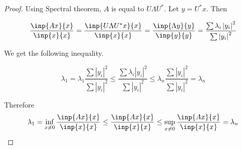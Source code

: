 \documentclass[twoside]{article}
\newcommand*\adj[1]{#1^*}
\newcommand*\abs[1]{\left \vert #1 \right\vert}
\theoremstyle{plain}
\newtheorem{theorem}{Theorem}
\theoremstyle{definition}
\theoremstyle{remark}
\begin{document}
\begin{proof}  Using Spectral theorem, \(A\) is equal to \(U \Lambda \adj{U}\). Let \(y = \adj{U}x\). Then 

\[\frac{\inp{Ax}{x}}{\inp{x}{x}}  = \frac{\inp{U\Lambda \adj{U}x}{x}}{\inp{x}{x}} = \frac{\inp{\Lambda y}{y}}{\inp{y}{y}} = \frac{\sum \lambda_i \abs{y_i}^2}{\sum \abs{y_i}^2}\]


We get the following inequality. 

\[\lambda_1 = \lambda_1 \frac{\sum \abs{y_i}^2}{\sum \abs{y_i}^2} \le \frac{\sum \lambda_i \abs{y_i}^2}{\sum \abs{y_i}^2} \le  \lambda_n \frac{\sum \abs{y_i}^2}{\sum \abs{y_i}^2} = \lambda_n\]

Therefore \[ \lambda_1 =  \inf _{x \ne 0} \frac{\inp{Ax}{x}}{\inp{x}{x}} \le \frac{\inp{Ax}{x}}{\inp{x}{x}} \le  \sup _{x \ne 0} \frac{\inp{Ax}{x}}{\inp{x}{x}} =  \lambda_n\]
\end{proof}








\end{document}
